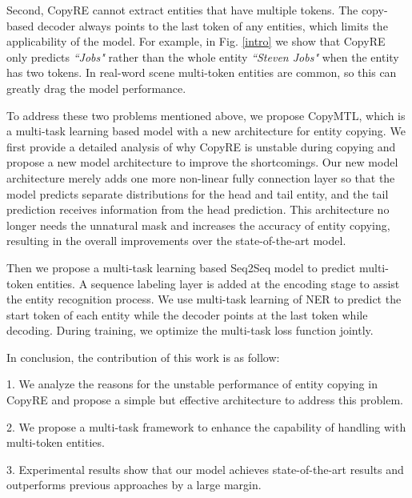 \documentclass[letterpaper]{article} \usepackage{aaai20}  \usepackage{times}  \usepackage{helvet} \usepackage{courier}  \usepackage[hyphens]{url}  \usepackage{graphicx}
\begin{document}
   Second, CopyRE cannot extract entities that have multiple tokens. The copy-based decoder always points to the last token of any entities, which limits the applicability of the model.
   For example, in Fig. \ref{intro} we show that CopyRE only predicts \textit{``Jobs"} rather than the whole entity \textit{``Steven Jobs"} when the entity has two tokens. In real-word scene multi-token entities are common, so this can greatly drag the model performance.
  
  
  To address these two problems mentioned above, we propose CopyMTL, which is a multi-task learning based model with a new architecture for entity copying. We first provide a detailed analysis of why CopyRE is unstable during copying and propose a new model architecture to improve the shortcomings. Our new model architecture merely adds one more non-linear fully connection layer so that the model predicts separate distributions for the head and tail entity, and the tail prediction receives information from the head prediction. This architecture no longer needs the unnatural mask and increases the accuracy of entity copying, resulting in the overall improvements over the state-of-the-art model.


  Then we propose a multi-task learning based Seq2Seq model to predict multi-token entities. A sequence labeling layer is added at the encoding stage to assist the entity recognition process. 
We use multi-task learning of NER to predict the start token of each entity while the decoder points at the last token while decoding. During training, we optimize the multi-task loss function jointly.
  
  In conclusion, the contribution of this work is as follow:
  
  1. We analyze the reasons for the unstable performance of entity copying in CopyRE and propose a simple but effective architecture to address this problem. 
  
  2. We propose a multi-task framework to enhance the capability of handling with multi-token entities.
  
  3. Experimental results show that our model achieves state-of-the-art results and outperforms previous approaches by a large margin.






  




  
\end{document}
